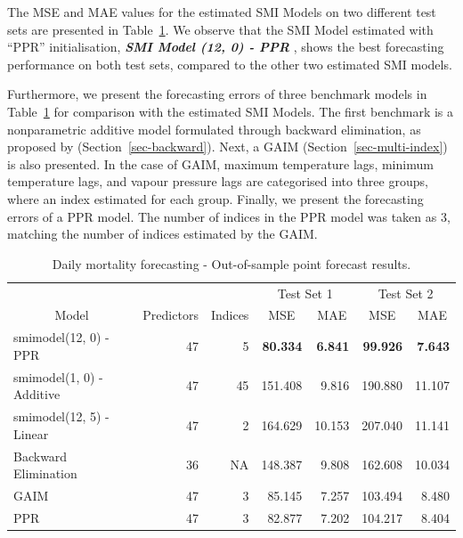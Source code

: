 \documentclass[11pt,a4paper,]{article}
\begin{document}
The MSE and MAE values for the estimated SMI Models on two different
test sets are presented in Table~\ref{tbl-heat}. We observe that the SMI
Model estimated with ``PPR'' initialisation, \textbf{\emph{SMI Model
(12, 0) - PPR }}, shows the best forecasting performance on both test
sets, compared to the other two estimated SMI models.

Furthermore, we present the forecasting errors of three benchmark models
in Table~\ref{tbl-heat} for comparison with the estimated SMI Models.
The first benchmark is a nonparametric additive model formulated through
backward elimination, as proposed by \textcite{FH2012}
(Section~\ref{sec-backward}). Next, a GAIM
(Section~\ref{sec-multi-index}) is also presented. In the case of GAIM,
maximum temperature lags, minimum temperature lags, and vapour pressure
lags are categorised into three groups, where an index estimated for
each group. Finally, we present the forecasting errors of a PPR model.
The number of indices in the PPR model was taken as 3, matching the
number of indices estimated by the GAIM.

\hypertarget{tbl-heat}{}
\begin{table}[!h]
\caption{\label{tbl-heat}Daily mortality forecasting - Out-of-sample point forecast results. }\tabularnewline

\centering
\begin{tabular}{lrr>{}r>{}r>{}r>{}r}
\toprule
\multicolumn{1}{c}{} & \multicolumn{1}{c}{} & \multicolumn{1}{c}{} & \multicolumn{2}{c}{Test Set 1} & \multicolumn{2}{c}{Test Set 2} \\
\cmidrule(l{3pt}r{3pt}){4-5} \cmidrule(l{3pt}r{3pt}){6-7}
\multicolumn{1}{c}{Model} & \multicolumn{1}{c}{Predictors} & \multicolumn{1}{c}{Indices} & \multicolumn{1}{c}{MSE} & \multicolumn{1}{c}{MAE} & \multicolumn{1}{c}{MSE} & \multicolumn{1}{c}{MAE}\\
\midrule
smimodel(12, 0) - PPR & 47 & 5 & \textbf{80.334} & \textbf{6.841} & \textbf{99.926} & \textbf{7.643}\\
smimodel(1, 0) - Additive & 47 & 45 & 151.408 & 9.816 & 190.880 & 11.107\\
smimodel(12, 5) - Linear & 47 & 2 & 164.629 & 10.153 & 207.040 & 11.141\\
Backward Elimination & 36 & NA & 148.387 & 9.808 & 162.608 & 10.034\\
GAIM & 47 & 3 & 85.145 & 7.257 & 103.494 & 8.480\\
\addlinespace
PPR & 47 & 3 & 82.877 & 7.202 & 104.217 & 8.404\\
\bottomrule
\end{tabular}
\end{table}
\end{document}

